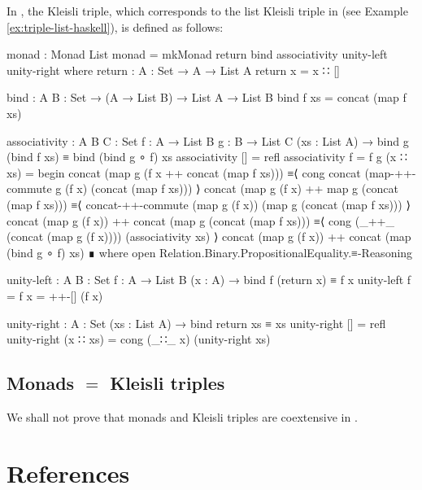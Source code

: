 \begin{example}
  \label{ex:triple-list-agda}

  In \agda, the  Kleisli triple, which corresponds to
  the list Kleisli triple in \hask (see Example
  \ref{ex:triple-list-haskell}), is defined as follows:
  \begin{codeagda}
monad : Monad List
monad = mkMonad return bind associativity unity-left unity-right
  where
    return : {A : Set} → A → List A
    return x = x ∷ []

    bind : {A B : Set} → (A → List B) → List A → List B
    bind f xs = concat (map f xs)

    associativity : {A B C : Set} {f : A → List B} {g : B → List C}
                    (xs : List A) → bind g (bind f xs) ≡ bind (bind g ∘ f) xs
    associativity             []       = refl
    associativity {f = f} {g} (x ∷ xs) =
      begin
        concat (map g (f x ++ concat (map f xs)))
          ≡⟨ cong concat (map-++-commute g (f x) (concat (map f xs))) ⟩
        concat (map g (f x) ++ map g (concat (map f xs)))
          ≡⟨ concat-++-commute (map g (f x)) (map g (concat (map f xs))) ⟩
        concat (map g (f x)) ++ concat (map g (concat (map f xs)))
          ≡⟨ cong (_++_ (concat (map g (f x)))) (associativity xs) ⟩
        concat (map g (f x)) ++ concat (map (bind g ∘ f) xs)
      ∎
        where open Relation.Binary.PropositionalEquality.≡-Reasoning

    unity-left : {A B : Set} {f : A → List B} (x : A) →
                 bind f (return x) ≡ f x
    unity-left {f = f} x = ++-[] (f x)

    unity-right : {A : Set} (xs : List A) → bind return xs ≡ xs
    unity-right []       = refl
    unity-right (x ∷ xs) = cong (_∷_ x) (unity-right xs)
  \end{codeagda}

\end{example}

\subsection*{Monads $=$ Kleisli triples}

We shall not prove that monads and Kleisli triples are coextensive in
\agda.

\section{References}
\label{sec:monads-references}

